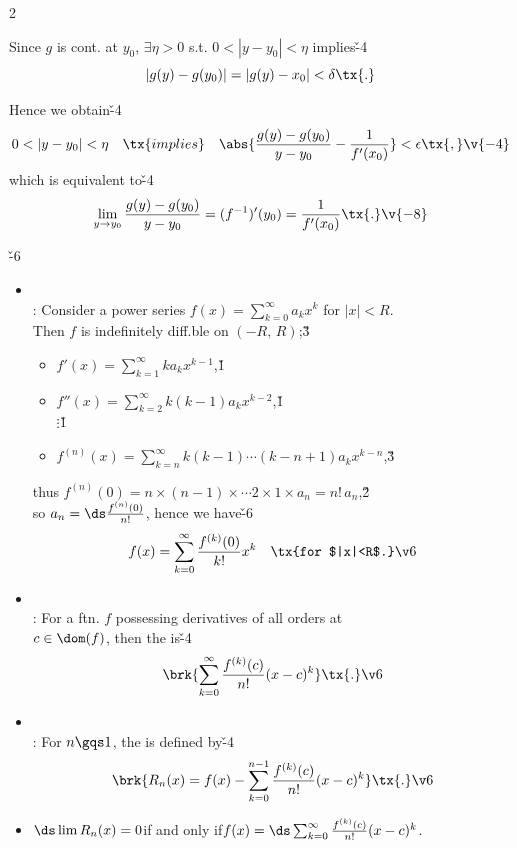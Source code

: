 \documentclass[dvipdfmx,a4paper,titlepage,9pt]{jsarticle}
\begin{document}
\begin{multicols*}{2}
\begin{Pfbox}
Since $g$ is cont. at $y_0$, $\exists\eta>0$ s.t. $0<|y-y_0|<\eta$ implies\v{-4}
$$|g(y)-g(y_0)|=|g(y)-x_0|<\delta\tx{.}$$

Hence we obtain\v{-4}
$$0<|y-y_0|<\eta\quad\tx{implies}\quad\abs{\frac{g(y)-g(y_0)}{y-y_0}-\frac1{f'(x_0)}}<\epsilon\tx{,}\v{-4}$$
which is equivalent to\v{-4}
$$\lim_{y\to y_0}\frac{g(y)-g(y_0)}{y-y_0}=(f^{-1})'(y_0)=\frac1{f'(x_0)}\tx{.}\v{-8}$$
\end{Pfbox}

\newpage


\v{-6}
\begin{itemize}[label={-}]
\item{}\\
: Consider a power series $f(x)=\sum_{k=0}^\infty a_kx^k$ for $|x|<R$.\\
\;\;Then $f$ is indefinitely diff.ble on $(-R,\,R)$;\v3
\begin{itemize}[label=\Cdot]
\setlength{\leftskip}{-3pt}
\item $f'(x)=\sum_{k=1}^\infty ka_kx^{k-1}$,\v1
\item $f''(x)=\sum_{k=2}^\infty k(k-1)a_kx^{k-2}$,\v1\\
\qquad\qquad$\vdots$\v1
\item $f^{(n)}(x)=\sum_{k=n}^\infty k(k-1)\cdots(k-n+1)a_kx^{k-n}$,\v3
\end{itemize}
\;\;thus $f^{(n)}(0)=n\times(n-1)\times\cdots2\times1\times a_n=n!\,a_n$,\v2\\
\;\;so $a_n=\ds\frac{f^{(n)}(0)}{n!}$, hence we have\v{-6}
$$f(x)=\sum_{k=0}^\infty\frac{f^{(k)}(0)}{k!}x^k\quad\tx{for $|x|<R$.}\v6$$

\item{}\\
: For a ftn. $f$ possessing derivatives of all orders at \\
\;\;$c\in\dom(f)$, then the  is\v{-4}
$$\brk{\sum_{k=0}^\infty\frac{f^{(k)}(c)}{n!}(x-c)^k}\tx{.}\v6$$

\item{}\\
: For $n\gqs1$, the  is defined by\v{-4}
$$\brk{R_n(x)=f(x)-\sum_{k=0}^{n-1}\frac{f^{(k)}(c)}{n!}(x-c)^k}\tx{.}\v6$$

\item $\ds\lim R_n(x)=0$\;\;if and only if\;\;$f(x)=\ds\sum_{k=0}^\infty\frac{f^{(k)}(c)}{n!}(x-c)^k$.\\


\end{itemize}
\end{multicols*}
\end{document}
